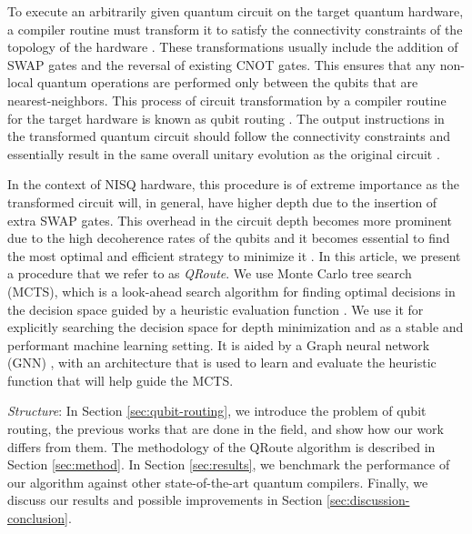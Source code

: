 \documentclass[%
 reprint,
amsmath,amssymb,showkeys,
pra,
]{revtex4-2}
\begin{document}
To execute an arbitrarily given quantum circuit on the target quantum hardware, a compiler routine must transform it to satisfy the connectivity constraints of the topology of the hardware \citep{qroute_tket}. These transformations usually include the addition of SWAP gates and the reversal of existing CNOT gates. This ensures that any non-local quantum operations are performed only between the qubits that are nearest-neighbors. This process of circuit transformation by a compiler routine for the target hardware is known as qubit routing \citep{qroute_tket}. The output instructions in the transformed quantum circuit should follow the connectivity constraints and essentially result in the same overall unitary evolution as the original circuit \citep{qroute_dqn2}.

In the context of NISQ hardware, this procedure is of extreme importance as the transformed circuit will, in general, have higher depth due to the insertion of extra SWAP gates. This overhead in the circuit depth becomes more prominent due to the high decoherence rates of the qubits and it becomes essential to find the most optimal and efficient strategy to minimize it \citep{qroute_tket, qroute_dqn1, qroute_dqn2}. In this article, we present a procedure that we refer to as \textit{QRoute}. We use Monte Carlo tree search (MCTS), which is a look-ahead search algorithm for finding optimal decisions in the decision space guided by a heuristic evaluation function \citep{mcts_bandit_1, mcts_bandit_2, mcts_uct}. We use it for explicitly searching the decision space for depth minimization and as a stable and performant machine learning setting. It is aided by a Graph neural network (GNN) \citep{nn_edge_conv}, with an architecture that is used to learn and evaluate the heuristic function that will help guide the MCTS.

\textit{Structure}: In Section \ref{sec:qubit-routing}, we introduce the problem of qubit routing, the previous works that are done in the field, and show how our work differs from them. The methodology of the QRoute algorithm is described in Section \ref{sec:method}. In Section \ref{sec:results}, we benchmark the performance of our algorithm against other state-of-the-art quantum compilers. Finally, we discuss our results and  possible improvements in Section \ref{sec:discussion-conclusion}.
\end{document}
